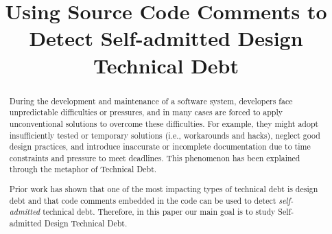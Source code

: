 \documentclass[conference]{IEEEtran}
\newcommand{\SADTD}{Self-admitted Design Technical Debt\xspace}
\begin{document}
\title{Using Source Code Comments to Detect \SADTD}

\author{

}

\maketitle

\begin{abstract}
During the development and maintenance of a software system, developers face unpredictable difficulties or pressures, and in many cases are forced to apply unconventional solutions to overcome these difficulties. For example, they might adopt insufficiently tested or temporary solutions (i.e., workarounds and hacks), neglect good design practices, and introduce inaccurate or incomplete documentation due to time constraints and pressure to meet deadlines. This phenomenon has been explained through the metaphor of Technical Debt.

Prior work has shown that one of the most impacting types of technical debt is design debt and that code comments embedded in the code can be used to detect \emph{self-admitted} technical debt. Therefore, in this paper our main goal is to study \SADTD. 

\end{abstract}
\end{document}
